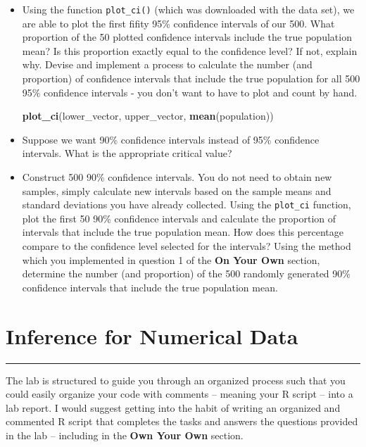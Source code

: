 \documentclass[]{book}
\newenvironment{Shaded}{\begin{snugshade}}{\end{snugshade}}
\newcommand{\KeywordTok}[1]{\textcolor[rgb]{0.13,0.29,0.53}{\textbf{#1}}}
\newcommand{\NormalTok}[1]{#1}
\theoremstyle{definition}
\theoremstyle{definition}
\theoremstyle{definition}
\theoremstyle{remark}
\begin{document}
\begin{itemize}
\item
  Using the function \texttt{plot\_ci()} (which was downloaded with the
  data set), we are able to plot the first fifity 95\% confidence
  intervals of our 500. What proportion of the 50 plotted confidence
  intervals include the true population mean? Is this proportion exactly
  equal to the confidence level? If not, explain why. Devise and
  implement a process to calculate the number (and proportion) of
  confidence intervals that include the true population for all 500 95\%
  confidence intervals - you don't want to have to plot and count by
  hand.

\begin{Shaded}
\begin{Highlighting}[]
\KeywordTok{plot_ci}\NormalTok{(lower_vector, upper_vector, }\KeywordTok{mean}\NormalTok{(population))}
\end{Highlighting}
\end{Shaded}
\item
  Suppose we want 90\% confidence intervals instead of 95\% confidence
  intervals. What is the appropriate critical value?
\item
  Construct 500 90\% confidence intervals. You do not need to obtain new
  samples, simply calculate new intervals based on the sample means and
  standard deviations you have already collected. Using the
  \texttt{plot\_ci} function, plot the first 50 90\% confidence
  intervals and calculate the proportion of intervals that include the
  true population mean. How does this percentage compare to the
  confidence level selected for the intervals? Using the method which
  you implemented in question 1 of the \textbf{On Your Own} section,
  determine the number (and proportion) of the 500 randomly generated
  90\% confidence intervals that include the true population mean.
\end{itemize}

\chapter{Inference for Numerical
Data}\label{inference-for-numerical-data}

\begin{center}\rule{0.5\linewidth}{\linethickness}\end{center}

The lab is structured to guide you through an organized process such
that you could easily organize your code with comments -- meaning your R
script -- into a lab report. I would suggest getting into the habit of
writing an organized and commented R script that completes the tasks and
answers the questions provided in the lab -- including in the
\textbf{Own Your Own} section.
\end{document}

